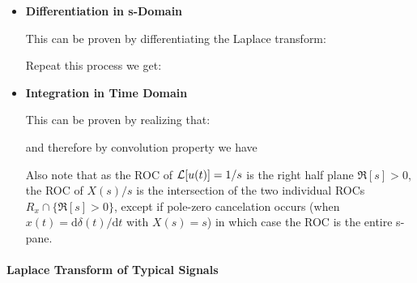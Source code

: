 \begin{itemize}
	
	{\bf Example } The ROC of ${\cal L}[\delta(t)]=1$ is the entire s-plane, and we have:
	
	and more generally:
	
	
	\item {\bf Differentiation in s-Domain}
	
	This can be proven by differentiating the Laplace transform:
	
	Repeat this process we get:
	
	
	\item {\bf Integration in Time Domain}
	
	This can be proven by realizing that:
	
	and therefore by convolution property we have
	
	Also note that as the ROC of ${\cal L}[u(t)]=1/s$ is the right half plane $\Re[s]>0$, 
	the ROC of $X(s)/s$ is the intersection of the two individual ROCs 
	$R_x \cap \{\Re[s]>0\}$, except if pole-zero cancelation occurs 
	(when $x(t)=\mathrm{d}\delta(t)/\mathrm{d}t$ with $X(s)=s$) in which case the ROC is the
	entire s-pane.
	
	\end{itemize}
	
	\paragraph{Laplace Transform of Typical Signals}\mbox{}\\\\
	
